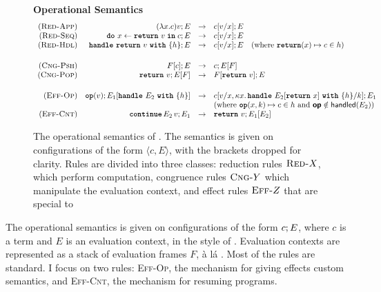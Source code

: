 \begin{figure}[ht]
\begin{eff-desc}
{\noindent\textbf{Operational Semantics}}
  {\scriptsize
\[
  \begin{array}{rrcl}
  \reductionRule{App} & \transition{\effconfiguration{(\function{x}{c})v}{E}}{\effconfiguration{c[v/x]}{E}}\\
  \reductionRule{Seq} & \transition{\effconfiguration{\bind{x}{\return{v}}{c}}{E}}{\effconfiguration{c[v/x]}{E}}\\
  \reductionRule{Hdl} & \transition{\effconfiguration{\handleWith{\return{v}}{h}}{E}}{\effconfiguration{c[v/x]}{E}} \quad (\text{where $\returnHandler{x}{c} \in h$)}\\
  \vspace{1mm} \\ 
  \congruenceRule{Psh} & \transition{\effconfiguration{F[c]}{E}}{\effconfiguration{c}{E[F]}} \\
  \congruenceRule{Pop} & \transition{\effconfiguration{\return{v}}{E[F]}}{\effconfiguration{F[\return{v}]}{E}}\\
  \vspace{1mm} \\
  \effectRule{Op} & \transition{\effconfiguration{\op{v}}{E_1[\handleWith{E_2}{h}]}}\effconfiguration{c[v/x, \kappa x. \, \handleWith{E_2[\return{x}]}{h} / k]}{E_1}\\
  &&& \text{(where $\opHandler{x}{k}{c} \in h$ and $\textbf{\textsf{op}} \notin \textsf{handled}(E_2)$)}\\
  \effectRule{Cnt} & \transition{\effconfiguration{\continue{E_2}{v}}{E_1}}{\effconfiguration{\return{v}}{E_1[E_2]}}

\end{array}
\]
  }
\end{eff-desc}
\caption{The operational semantics of \efflang. The semantics is given on configurations of the form $\langle c, E \rangle$, with the brackets dropped for clarity. Rules are divided into three classes: reduction rules $\textsc{Red-}X$, which perform computation, congruence rules $\textsc{Cng-}Y$ which manipulate the evaluation context, and effect rules $\textsc{Eff-}Z$ that are special to \efflang}
\label{fig:efflang-opsem}
\end{figure}

The operational semantics is given on configurations of the form ${c}; {E}$, where $c$ is a term and $E$ is an evaluation context, in the style of \citet{felleisen-87}. Evaluation contexts are represented as a stack of evaluation frames $F$, à lá \citet{kiselyov-2012}. Most of the rules are standard. I focus on two rules: \textsc{Eff-Op}, the mechanism for giving effects custom semantics, and \textsc{Eff-Cnt}, the mechanism for resuming programs. 

